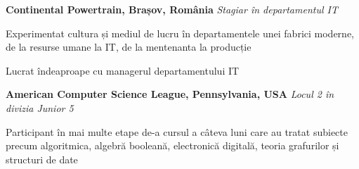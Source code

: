 
{}%
%
\textbf{Continental Powertrain, Brașov, România} \newline
\emph{Stagiar în departamentul IT} 
\begin{itemize*}
  \item Experimentat cultura și mediul de lucru în departamentele unei fabrici moderne, de la resurse umane la IT, de la mentenanta la producție
  \item Lucrat îndeaproape cu managerul departamentului IT
\end{itemize*}


\smallskip
\textbf{American Computer Science League, Pennsylvania, USA} \newline
\emph{Locul 2 în divizia Junior 5} 
\begin{itemize*}
  \item Participant în mai multe etape de-a cursul a câteva luni care au tratat subiecte precum algoritmica, algebră booleană, electronică digitală, teoria grafurilor și structuri de date
\end{itemize*}
